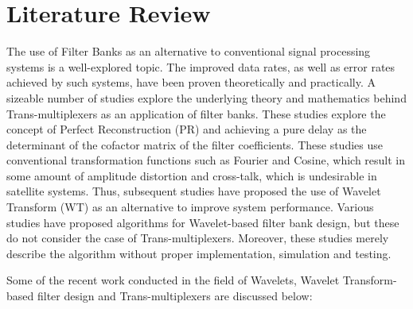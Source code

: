 \chapter{Literature Review}
The use of Filter Banks as an alternative to conventional signal processing systems is a well-explored topic. The improved data rates, as well as error rates achieved by such systems, have been proven theoretically and practically. A sizeable number of studies explore the underlying theory and mathematics behind Trans-multiplexers as an application of filter banks. These studies explore the concept of Perfect Reconstruction (PR) and achieving a pure delay as the determinant of the cofactor matrix of the filter coefficients. These studies use conventional transformation functions such as Fourier and Cosine, which result in some amount of amplitude distortion and cross-talk, which is undesirable in satellite systems. Thus, subsequent studies have proposed the use of Wavelet Transform (WT) as an alternative to improve system performance. Various studies have proposed algorithms for Wavelet-based filter bank design, but these do not consider the case of Trans-multiplexers. Moreover, these studies merely describe the algorithm without proper implementation, simulation and testing. \par
Some of the recent work conducted in the field of Wavelets, Wavelet Transform-based filter design and Trans-multiplexers are discussed below:


